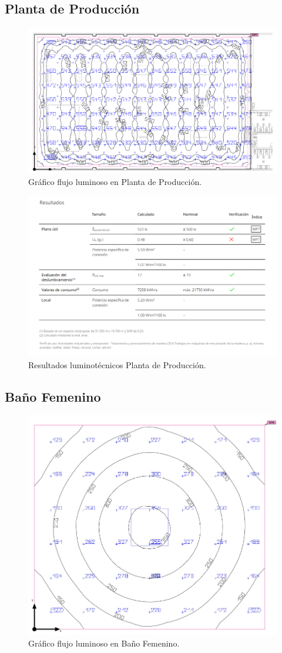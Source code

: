 \documentclass[../main.tex]{subfiles}
\begin{document}
\subsection{Planta de Producción}
\begin{figure}[H]
    \centering
    \includegraphics[width=0.5\linewidth]{Imagenes/Iluminacion Planta Produccion.png}
    \caption{Gráfico flujo luminoso en Planta de Producción.}
\end{figure}

\begin{figure}[H]
    \centering
    \includegraphics[width=0.75\linewidth]{Imagenes/Resultados Iluminacion Planta de Produccion.png}
    \caption{Resultados luminotécnicos Planta de Producción.}
\end{figure}

\subsection{Baño Femenino}
\begin{figure}[H]
    \centering
    \includegraphics[width=0.5\linewidth]{Imagenes/Iluminacion Bano Femenino.png}
    \caption{Gráfico flujo luminoso en Baño Femenino.}
\end{figure}
\end{document}
